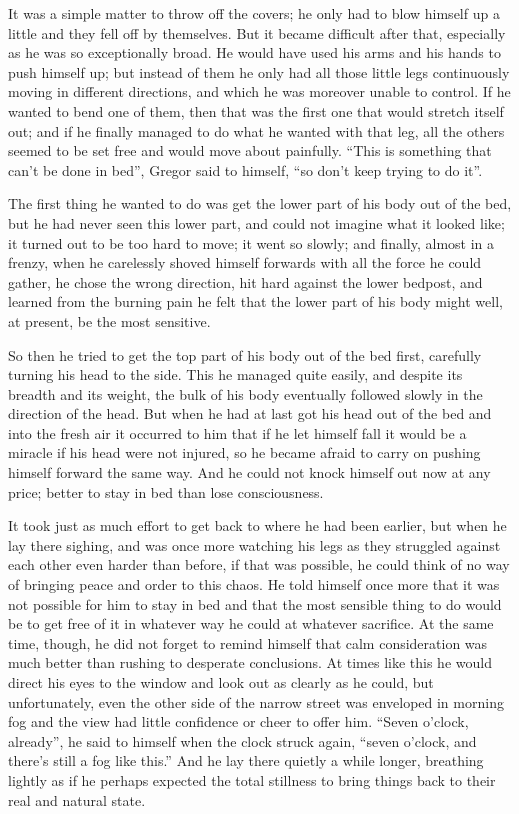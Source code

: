 It was a simple matter to throw off the covers; he only had to blow
himself up a little and they fell off by themselves. But it became
difficult after that, especially as he was so exceptionally broad. He
would have used his arms and his hands to push himself up; but instead
of them he only had all those little legs continuously moving in
different directions, and which he was moreover unable to control. If
he wanted to bend one of them, then that was the first one that would
stretch itself out; and if he finally managed to do what he wanted with
that leg, all the others seemed to be set free and would move about
painfully. “This is something that can’t be done in bed”, Gregor said
to himself, “so don’t keep trying to do it”.

The first thing he wanted to do was get the lower part of his body out
of the bed, but he had never seen this lower part, and could not
imagine what it looked like; it turned out to be too hard to move; it
went so slowly; and finally, almost in a frenzy, when he carelessly
shoved himself forwards with all the force he could gather, he chose
the wrong direction, hit hard against the lower bedpost, and learned
from the burning pain he felt that the lower part of his body might
well, at present, be the most sensitive.

So then he tried to get the top part of his body out of the bed first,
carefully turning his head to the side. This he managed quite easily,
and despite its breadth and its weight, the bulk of his body eventually
followed slowly in the direction of the head. But when he had at last
got his head out of the bed and into the fresh air it occurred to him
that if he let himself fall it would be a miracle if his head were not
injured, so he became afraid to carry on pushing himself forward the
same way. And he could not knock himself out now at any price; better
to stay in bed than lose consciousness.

It took just as much effort to get back to where he had been earlier,
but when he lay there sighing, and was once more watching his legs as
they struggled against each other even harder than before, if that was
possible, he could think of no way of bringing peace and order to this
chaos. He told himself once more that it was not possible for him to
stay in bed and that the most sensible thing to do would be to get free
of it in whatever way he could at whatever sacrifice. At the same time,
though, he did not forget to remind himself that calm consideration was
much better than rushing to desperate conclusions. At times like this
he would direct his eyes to the window and look out as clearly as he
could, but unfortunately, even the other side of the narrow street was
enveloped in morning fog and the view had little confidence or cheer to
offer him. “Seven o’clock, already”, he said to himself when the clock
struck again, “seven o’clock, and there’s still a fog like this.” And
he lay there quietly a while longer, breathing lightly as if he perhaps
expected the total stillness to bring things back to their real and
natural state.

